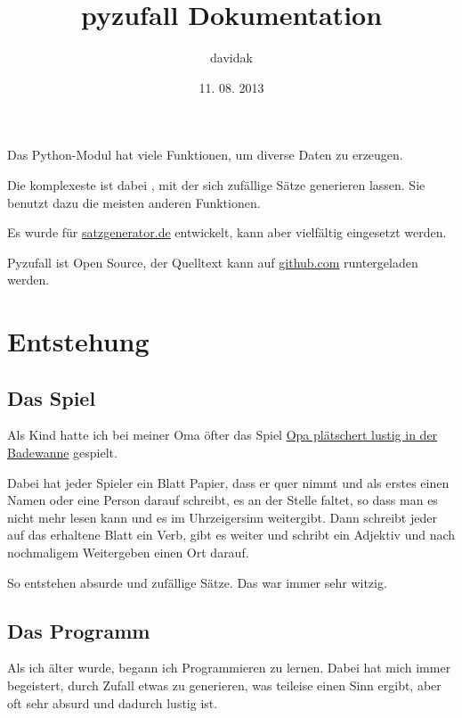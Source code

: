 \documentclass[a4paper,12pt,oneside]{sphinxmanual}
\title{pyzufall Dokumentation}
\date{11. 08. 2013}
\author{davidak}
\begin{document}
\maketitle
\tableofcontents
{}\label{index::doc}


Das Python-Modul {\hyperref[funktionen:module-pyzufall]{}} hat viele Funktionen, um diverse Daten zu erzeugen.

Die komplexeste ist dabei {\hyperref[funktionen:pyzufall.satz]{}}, mit der sich zufällige Sätze generieren lassen. Sie benutzt dazu die meisten anderen Funktionen.

Es wurde für \href{http://satzgenerator.de/}{satzgenerator.de} entwickelt, kann aber vielfältig eingesetzt werden.

Pyzufall ist Open Source, der Quelltext kann auf \href{https://github.com/davidak/pyzufall/}{github.com} runtergeladen werden.


\chapter{Entstehung}
\label{entstehung::doc}\label{entstehung:entstehung}\label{entstehung:dokumentation-von-pyzufall}

\section{Das Spiel}
\label{entstehung:das-spiel}
Als Kind hatte ich bei meiner Oma öfter das Spiel \href{http://www.mama-tipps.de/tipp/Opa-plaetschert-Badewanne.html}{Opa plätschert lustig in der Badewanne} gespielt.

Dabei hat jeder Spieler ein Blatt Papier, dass er quer nimmt und als erstes einen Namen oder eine Person darauf schreibt, es an der Stelle faltet, so dass man es nicht mehr lesen kann und es im Uhrzeigersinn weitergibt. Dann schreibt jeder auf das erhaltene Blatt ein Verb, gibt es weiter und schribt ein Adjektiv und nach nochmaligem Weitergeben einen Ort darauf.

So entstehen absurde und zufällige Sätze. Das war immer sehr witzig.


\section{Das Programm}
\label{entstehung:das-programm}
Als ich älter wurde, begann ich Programmieren zu lernen. Dabei hat mich immer begeistert, durch Zufall etwas zu generieren, was teileise einen Sinn ergibt, aber oft sehr absurd und dadurch lustig ist.
\end{document}
